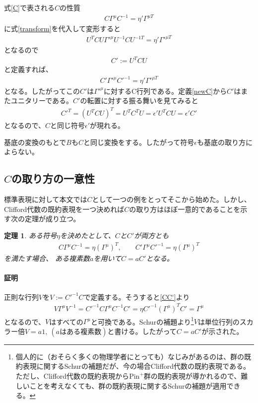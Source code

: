 \documentclass[12pt,a4paper]{jlreq}
\newcommand{\Pin}{\mathrm{Pin}^{+}}
\newtheorem{theo}{定理}
\begin{document}
式\eqref{C}で表される$C$の性質
\begin{align*}
  C\Gamma^{\mu}C^{-1}=\eta'\Gamma^{\mu T}
\end{align*}
に式\eqref{transform}を代入して変形すると
\begin{align*}
  U^{T}C U \Gamma'^{\mu} U^{-1}CU^{-1 T}=\eta'\Gamma'^{\mu T}
\end{align*}
となるので
\begin{align}
  C':=U^{T}C U\label{newC}
\end{align}
と定義すれば、
\begin{align*}
  C' \Gamma'^{\mu} C'^{-1}=\eta'\Gamma'^{\mu T}
\end{align*}
となる。したがってこの$C'$は$\Gamma'^{\mu}$に対するC行列である。定義\eqref{newC}から$C'$はまたユニタリーである。$C'$の転置に対する振る舞いを見てみると
\begin{align*}
  C'^{T}=(U^T C U)^{T}
  =U^T C^T U
  =\epsilon'U^T C U
  =\epsilon' C'
\end{align*}
となるので、$C$と同じ符号$\epsilon'$が現れる。

基底の変換のもとで$B$も$C$と同じ変換をする。したがって符号$\epsilon$も基底の取り方によらない。

\subsection{$C$の取り方の一意性}
標準表現に対して本文では$C$として一つの例をとってそこから始めた。しかし、Clifford代数の既約表現を一つ決めれば$C$の取り方はほぼ一意的であることを示す次の定理が成り立つ。
\begin{theo}
  ある符号$\eta$を決めたとして、$C$と$C'$が両方とも
\begin{align}
  C\Gamma^{\mu}C^{-1}=\eta (\Gamma^{\mu})^{T},\qquad  C'\Gamma^{\mu}C'^{-1}=\eta (\Gamma^{\mu})^{T}
  \label{CC'}
\end{align}
を満たす場合、
  ある複素数$a$を用いて$C=a C'$となる。
\end{theo}

\paragraph{証明} 正則な行列$V$を$V:=C'^{-1}C$で定義する。そうすると\eqref{CC'}より
\begin{align}
  V\Gamma^{\mu} V^{-1} 
  =C'^{-1}C\Gamma^{\mu}C^{-1} C'
  =\eta C'^{-1}(\Gamma^{\mu})^{T} C'
  =\Gamma^{\mu}
\end{align}
となるので、$V$はすべての$\Gamma^{\mu}$と可換である。Schurの補題より\footnote{個人的に（おそらく多くの物理学者にとっても）なじみがあるのは、群の既約表現に関するSchurの補題だが、今の場合Clifford代数の既約表現である。ただし、Clifford代数の既約表現から$\Pin$群の既約表現が導かれるので、難しいことを考えなくても、群の既約表現に関するSchurの補題が適用できる。}$V$は単位行列のスカラー倍$V=a 1,\ (a \text{はある複素数})$と書ける。したがって$C=aC'$が示された。
\end{document}
